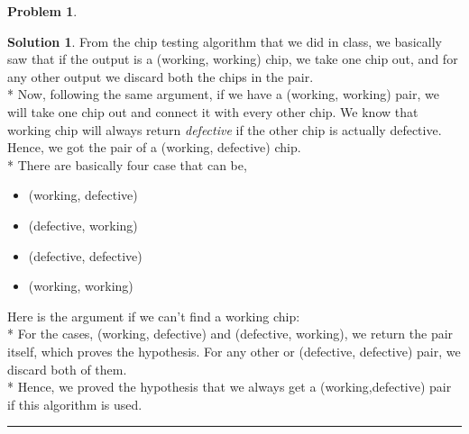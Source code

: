 \documentclass{article}
\theoremstyle{definition}
\newtheorem{problem}{Problem}
\def\fline{\rule{0.75\linewidth}{0.5pt}}
\newcommand{\finishline}{\begin{center}\fline\end{center}}
\newtheorem*{solution*}{Solution}
\newenvironment{solution}{\begin{solution*}}{{\finishline} \end{solution*}}
\begin{document}
\begin{problem}
\begin{enumerate}
\begin{solution}
From the chip testing algorithm that we did in class, we basically saw that if the output is a (working, working)  chip, we take one chip out, and for any other output we discard both the chips in the pair. \bigskip\\*
 Now, following the same argument, if we have a (working, working) pair, we will take one chip out and connect it with every other chip. We know that working chip will always return {\textit{defective}} if the other chip is actually defective. Hence, we got the pair of a (working, defective) chip. \bigskip \\*
There are basically four case that can be,
	\begin{itemize}
		\item (working, defective)
		\item (defective, working)
		\item (defective, defective)
		\item (working, working)
	\end{itemize}
Here is the argument if we can't find a working chip:\\*
For the cases, (working, defective) and (defective, working), we return the pair itself, which proves the hypothesis. For any other or (defective, defective) pair, we discard both of them. \bigskip\\*
Hence, we proved the hypothesis that we always get a (working,defective) pair if this algorithm is used.
\end{solution}


\end{enumerate}
\end{problem}

\end{document}
